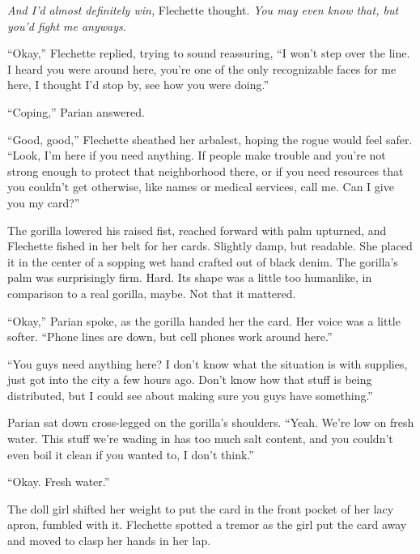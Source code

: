 \emph{And I'd almost definitely win,} Flechette thought. \emph{You may even know that, but you'd fight me anyways}.



``Okay,'' Flechette replied, trying to sound reassuring, ``I won't step over the line.  I heard you were around here, you're one of the only recognizable faces for me here, I thought I'd stop by, see how you were doing.''



``Coping,'' Parian answered.



``Good, good,'' Flechette sheathed her arbalest, hoping the rogue would feel safer.  ``Look, I'm here if you need anything.  If people make trouble and you're not strong enough to protect that neighborhood there, or if you need resources that you couldn't get otherwise, like names or medical services, call me.  Can I give you my card?''



The gorilla lowered his raised fist, reached forward with palm upturned, and Flechette fished in her belt for her cards.  Slightly damp, but readable.  She placed it in the center of a sopping wet hand crafted out of black denim.  The gorilla's palm was surprisingly firm.  Hard.  Its shape was a little too humanlike, in comparison to a real gorilla, maybe.  Not that it mattered.



``Okay,'' Parian spoke, as the gorilla handed her the card.  Her voice was a little softer.  ``Phone lines are down, but cell phones work around here.''



``You guys need anything here?  I don't know what the situation is with supplies, just got into the city a few hours ago.  Don't know how that stuff is being distributed, but I could see about making sure you guys have something.''



Parian sat down cross-legged on the gorilla's shoulders.  ``Yeah.  We're low on fresh water.  This stuff we're wading in has too much salt content, and you couldn't even boil it clean if you wanted to, I don't think.''



``Okay.  Fresh water.''



The doll girl shifted her weight to put the card in the front pocket of her lacy apron, fumbled with it.  Flechette spotted a tremor as the girl put the card away and moved to clasp her hands in her lap.



